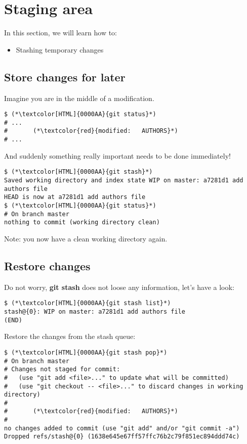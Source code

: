 \section{Staging area}
\begin{frame}[fragile]
  \slidetitle

  In this section, we will learn how to:
  \begin{itemize}
    \item Stashing temporary changes
  \end{itemize}
\end{frame}


\subsection{Store changes for later}
\begin{frame}[fragile]
\subslidetitle

Imagine you are in the middle of a modification.

\begin{lstlisting}
$ (*\textcolor[HTML]{0000AA}{git status}*)
# ...
#       (*\textcolor{red}{modified:   AUTHORS}*)
# ...
\end{lstlisting}

And suddenly something really important needs to be done immediately!

\begin{lstlisting}
$ (*\textcolor[HTML]{0000AA}{git stash}*)
Saved working directory and index state WIP on master: a7281d1 add authors file
HEAD is now at a7281d1 add authors file
$ (*\textcolor[HTML]{0000AA}{git status}*)
# On branch master
nothing to commit (working directory clean)
\end{lstlisting}
Note: you now have a clean working directory again.
\end{frame}


\subsection{Restore changes}
\begin{frame}[fragile]
\subslidetitle

Do not worry, \textbf{git stash} does not loose any information, let's have a look:

\begin{lstlisting}
$ (*\textcolor[HTML]{0000AA}{git stash list}*)
stash@{0}: WIP on master: a7281d1 add authors file
(END)
\end{lstlisting}

Restore the changes from the stash queue:

\begin{lstlisting}
$ (*\textcolor[HTML]{0000AA}{git stash pop}*)
# On branch master
# Changes not staged for commit:
#   (use "git add <file>..." to update what will be committed)
#   (use "git checkout -- <file>..." to discard changes in working directory)
#
#       (*\textcolor{red}{modified:   AUTHORS}*)
#
no changes added to commit (use "git add" and/or "git commit -a")
Dropped refs/stash@{0} (1638e645e67ff57ffc76b2c79f851ec894ddd74c)
\end{lstlisting}
\end{frame}
